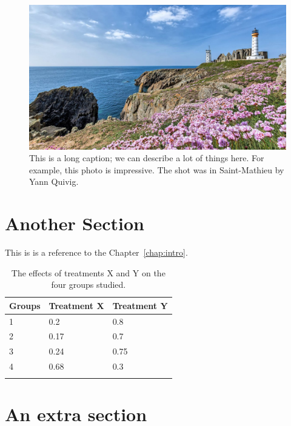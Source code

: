 \begin{figure}[tbh]
	\centering
	\includegraphics[width=0.7\linewidth]{Figures/saint_mathieu_avec_les_armeries_yann_quiviger-3215501}%
	\caption[Short caption goes to List of Figures]{This is a long caption; we can describe a lot of things here. For example, this photo is impressive. The shot was in Saint-Mathieu by Yann Quivig.}%
	\label{fig:test}
\end{figure}


\section{Another Section}\label{sec:another}
This is is a reference to the Chapter~\ref{chap:intro}.



\begin{table}[htb]
\caption{The effects of treatments X and Y on the four groups studied.}%
\label{tab:treatments}
\centering
\begin{tabular}{l l l}
\toprule
Groups & Treatment X & Treatment Y \\
\midrule
1 & 0.2 & 0.8\\
2 & 0.17 & 0.7\\
3 & 0.24 & 0.75\\
4 & 0.68 & 0.3\\
\bottomrule\\
\end{tabular}
\end{table}


\Blindtext%


\lipsum[6]

\section{An extra section}
\Blindtext%
	
